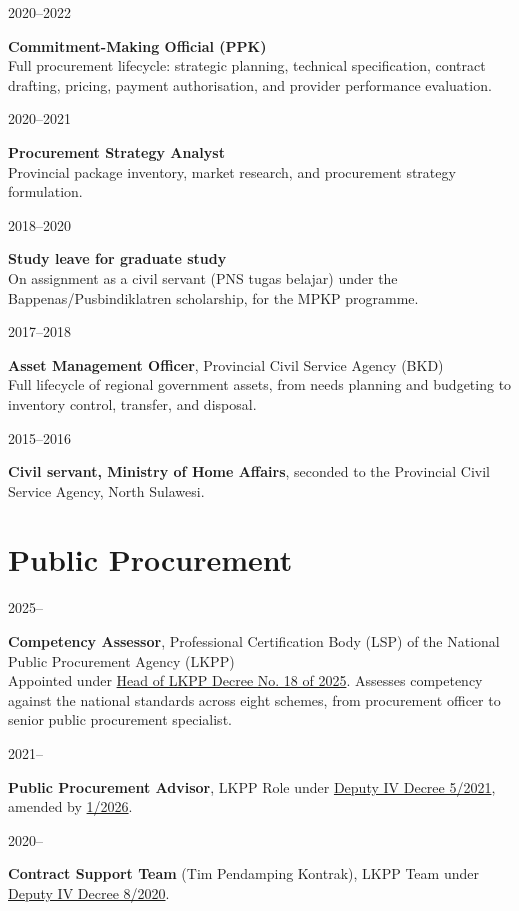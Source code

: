 \documentclass[11pt,a4paper]{article}
\newlength{\datecol}\setlength{\datecol}{0.155\textwidth}
\newlength{\bodycol}\setlength{\bodycol}{0.815\textwidth}
\newcommand{\entry}[2]{%
  \noindent
  \begin{minipage}[t]{\datecol}%
    \strut\raggedright\small\color{muted}#1%
  \end{minipage}%
  \hfill
  \begin{minipage}[t]{\bodycol}%
    \strut #2%
  \end{minipage}%
  \par\vspace{0.16em}}
\newcommand{\org}[1]{{\small\color{muted}#1}}
\begin{document}
\entry{2020--2022}{\textbf{Commitment-Making Official (PPK)}\\
  \org{Full procurement lifecycle: strategic planning, technical specification,
  contract drafting, pricing, payment authorisation, and provider performance
  evaluation.}}

\entry{2020--2021}{\textbf{Procurement Strategy Analyst}\\
  \org{Provincial package inventory, market research, and procurement strategy
  formulation.}}

\entry{2018--2020}{\textbf{Study leave for graduate study}\\
  \org{On assignment as a civil servant (PNS tugas belajar) under the
  Bappenas/Pusbindiklatren scholarship, for the MPKP programme.}}

\entry{2017--2018}{\textbf{Asset Management Officer}, Provincial Civil Service
  Agency (BKD)\\
  \org{Full lifecycle of regional government assets, from needs planning and
  budgeting to inventory control, transfer, and disposal.}}

\entry{2015--2016}{\textbf{Civil servant, Ministry of Home Affairs}, seconded to
  the Provincial Civil Service Agency, North Sulawesi.}

\section{Public Procurement}

\entry{2025--}{\textbf{Competency Assessor}, Professional Certification Body
  (LSP) of the National Public Procurement Agency (LKPP)\\
  \org{Appointed under \href{https://jdih.lkpp.go.id/regulation/keputusan-kepala-lkpp/keputusan-kepala-lkpp-nomor-18-tahun-2025}{Head
  of LKPP Decree No. 18 of 2025}. Assesses competency
  against the national standards across eight schemes, from procurement officer
  to senior public procurement specialist.}}

\entry{2021--}{\textbf{Public Procurement Advisor}, LKPP
  \org{Role under
  \href{https://jdih.lkpp.go.id/regulation/keputusan-deputi-iv/keputusan-deputi-iv-nomor-5-tahun-2021}{Deputy
  IV Decree 5/2021}, amended by
  \href{https://jdih.lkpp.go.id/regulation/keputusan-deputi-iv/keputusan-deputi-iv-nomor-1-tahun-2026}{1/2026}.}}

\entry{2020--}{\textbf{Contract Support Team} (Tim Pendamping Kontrak), LKPP
  \org{Team under
  \href{https://jdih.lkpp.go.id/regulation/keputusan-deputi-iv/keputusan-deputi-iv-nomor-8-tahun-2020}{Deputy
  IV Decree 8/2020}.}}
\end{document}
